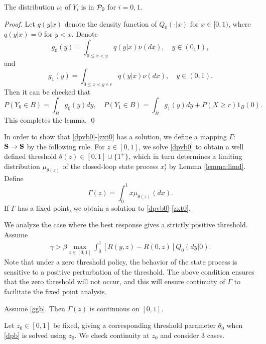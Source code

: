 \documentclass[graybox]{svmult}
\begin{document}
\begin{lemma}  \label{lemma:pi0}
The distribution $\nu_i$ of  $Y_i$ is in ${\cal P}_0$ for $i=0,1$.
\end{lemma}



\begin{proof}
Let $q(y|x)$ denote the density function of $Q_0(\cdot|x)$ for $x\in [0, 1)$, where $q(y|x)=0$ for $y<x$.  Denote
$$
g_0(y)= \int_{0\le x<y} q(y|x) \nu(dx), \quad y\in (0, 1),
$$
and
$$
g_1(y)= \int_{0\le x< y\wedge r} q(y|x) \nu (dx), \quad y\in (0, 1).
$$
Then it can be checked that
$$
P(Y_0\in B)=\int_B g_0(y) dy , \quad P(Y_1\in B)= \int_B g_1(y) dy +P(X\ge r) 1_B(0).
$$
This completes the lemma. \qed
\end{proof}






In order to show that \eqref{dpvb0}-\eqref{zxt0} has a solution, we define a mapping $\Gamma$: ${\bf S}\to {\bf S}$ by the following rule.
For $z\in [0,1]$, we solve \eqref{dpvb0} to obtain a well defined threshold
$\theta(z)\in [0, 1]\cup \{1^+\}$, which in turn determines a limiting distribution $\mu_{\theta(z)}$  of the closed-loop state process $x_t^i$
  by Lemma \ref{lemma:limd}. Define
 $$
 \Gamma (z)= \int_0^1 x \mu_{\theta(z)}(dx).
 $$
 If $\Gamma$ has a fixed point, we obtain a solution to \eqref{dpvb0}-\eqref{zxt0}.


 We analyze the case where the best response gives a strictly positive threshold.
Assume
\begin{align}
\gamma>\beta\max_{z\in [0,1]} \int_0^1 [R(y,z)-R(0,z)] Q_0(dy|0). \label{ggb}
\end{align}
Note that under  a zero threshold policy,
the behavior of the state process is sensitive to a positive perturbation of the threshold.
 The above condition ensures that  the zero threshold will not occur, and this will  ensure continuity of $\Gamma$ to  facilitate the fixed point analysis.





\begin{lemma} \label{lemma:Gam} Assume \eqref{ggb}.
Then $\Gamma(z)$ is continuous on $[0,1]$.
\end{lemma}

\proof Let $z_0\in [0, 1]$ be fixed, giving a corresponding threshold parameter   $\theta_0$ when \eqref{dpb} is solved using $z_0$.    We check continuity at $z_0$ and
 consider 3 cases.
\end{document}
